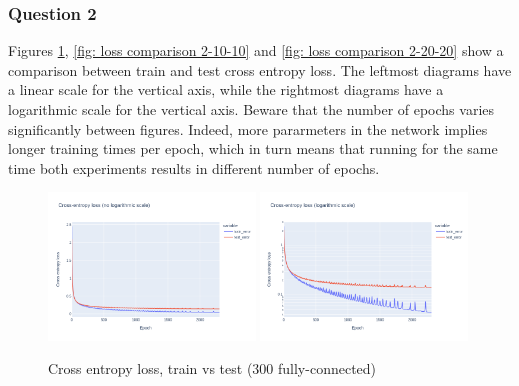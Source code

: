 \documentclass[12pt]{article}
\begin{document}
\subsubsection{Question 2}
Figures \ref{fig: loss comparison 1-300}, \ref{fig: loss comparison 2-10-10} and \ref{fig: loss comparison 2-20-20} show a comparison between train and test cross entropy loss.
The leftmost diagrams have a linear scale for the vertical axis, while the rightmost diagrams have a logarithmic scale for the vertical axis.
Beware that the number of epochs varies significantly between figures.
Indeed, more pararmeters in the network implies longer training times per epoch, which in turn means that running for the same time both experiments results in different number of epochs. \\
\begin{figure}[ht]
  \centering
  \includegraphics[width=0.49\textwidth]{images/cross-entropy-comparison-1-300.png}
  \includegraphics[width=0.49\textwidth]{images/cross-entropy-comparison-1-300-log.png}
  \caption{Cross entropy loss, train vs test ($300$ fully-connected)}
  \label{fig: loss comparison 1-300}
\end{figure}
\end{document}
